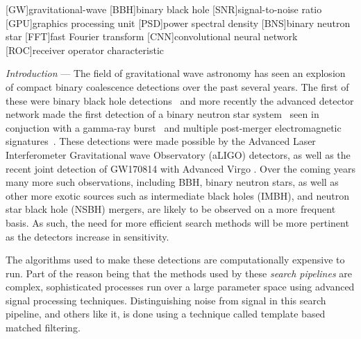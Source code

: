 \documentclass[%
 amsmath,amssymb,
 aps,
 twocolumn,
 prl,
 reprint,
floatfix,
]{revtex4-1}
\begin{document}
\maketitle

[GW]{gravitational-wave}
[BBH]{binary black hole}
[SNR]{signal-to-noise ratio}
[GPU]{graphics processing unit}
[PSD]{power spectral density}
[BNS]{binary neutron star}
[FFT]{fast Fourier transform}
[CNN]{convolutional neural network}
[ROC]{receiver operator characteristic}


%
%

%
%
\textit{Introduction} --- 
%
%
The field of gravitational wave astronomy has seen an explosion of compact
binary coalescence detections over the past several years. The first of these
were binary black hole detections~\cite{PhysRevLett.116.061102,
PhysRevLett.116.241103, PhysRevLett.118.221101} and more recently the advanced
detector network made the first detection of a binary neutron star
system~\cite{PhysRevLett.119.161101} seen in conjuction with a gamma-ray
burst~\cite{2017arXiv171005834L,2017arXiv171005446G,2017arXiv171005449S} and
multiple post-merger electromagnetic signatures~\cite{2017arXiv171005833L}.
These detections were made possible by the Advanced Laser Interferometer
Gravitational wave Observatory (aLIGO) detectors, as well as the recent joint
detection of GW170814 with Advanced Virgo \cite{PhysRevLett.119.141101}. Over
the coming years many more such observations, including \ac{BBH}, binary
neutron stars, as well as other more exotic sources such as intermediate black
holes (IMBH), and neutron star black hole (NSBH) mergers, are likely to be
observed on a more frequent basis. As such, the need for more efficient search
methods will be more pertinent as the detectors increase in sensitivity.

%
%
The algorithms used to make these detections \cite{0264-9381-33-21-215004, 0004-637X-748-2-136} are computationally expensive to run.
Part of the reason being that the methods used by these \textit{search
pipelines} are complex, sophisticated processes run over a large parameter
space using advanced signal processing techniques. Distinguishing noise from
signal in this search pipeline, and others like it, is done using a technique
called template based matched filtering. 
\end{document}
